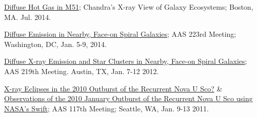 \documentclass[12pt]{article}
\begin{document}
\begin{etaremune}
\item \href{http://adsabs.harvard.edu/abs/2014xvge.confE..38S}{Diffuse Hot Gas in M51}; Chandra’s X-ray View of Galaxy Ecosystems; 
Boston, MA. Jul. 2014.

\item \href{http://adsabs.harvard.edu/abs/2014AAS...22345311S}{Diffuse Emission in Nearby, Face-on Spiral Galaxies}; AAS 223rd Meeting;
Washington, DC, Jan. 5-9, 2014.

\item \href{http://adsabs.harvard.edu/abs/2012AAS...21934630V}{Diffuse X-ray Emission and Star Clusters in Nearby, Face-on Spiral Galaxies}; AAS 219th Meeting. Austin, TX, Jan. 7-12 2012.

\item \href{http://adsabs.harvard.edu/abs/2011AAS...21733813M}{X-ray Eclipses in the 2010 Outburst of the Recurrent Nova U Sco?} \& \href{http://adsabs.harvard.edu/abs/2011AAS...21733812M}{Observations of the 2010 January Outburst of the Recurrent Nova U Sco using NASA's Swift}; AAS 117th Meeting;
Seattle, WA, Jan. 9-13 2011. 







\end{etaremune}
\end{document}
